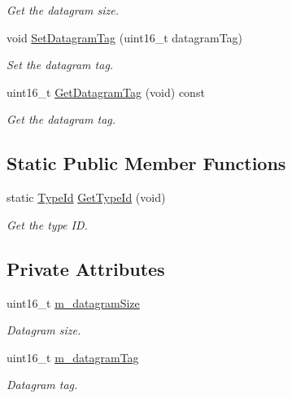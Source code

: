 \begin{DoxyCompactItemize}
\begin{DoxyCompactList}\small\item\em Get the datagram size. \end{DoxyCompactList}\item 
void \hyperlink{classns3_1_1SixLowPanFrag1_a52e5658907fdad50cd4fb0a6b708709c}{Set\+Datagram\+Tag} (uint16\+\_\+t datagram\+Tag)
\begin{DoxyCompactList}\small\item\em Set the datagram tag. \end{DoxyCompactList}\item 
uint16\+\_\+t \hyperlink{classns3_1_1SixLowPanFrag1_a9ff9beed8041cbce4454abf63d0c26d4}{Get\+Datagram\+Tag} (void) const 
\begin{DoxyCompactList}\small\item\em Get the datagram tag. \end{DoxyCompactList}\end{DoxyCompactItemize}
\subsection*{Static Public Member Functions}
\begin{DoxyCompactItemize}
\item 
static \hyperlink{classns3_1_1TypeId}{Type\+Id} \hyperlink{classns3_1_1SixLowPanFrag1_ab22c61041f7debb4239ffb6ed7fb4536}{Get\+Type\+Id} (void)
\begin{DoxyCompactList}\small\item\em Get the type ID. \end{DoxyCompactList}\end{DoxyCompactItemize}
\subsection*{Private Attributes}
\begin{DoxyCompactItemize}
\item 
uint16\+\_\+t \hyperlink{classns3_1_1SixLowPanFrag1_aead864146b5bc2382c2f17dfc0c64ec1}{m\+\_\+datagram\+Size}
\begin{DoxyCompactList}\small\item\em Datagram size. \end{DoxyCompactList}\item 
uint16\+\_\+t \hyperlink{classns3_1_1SixLowPanFrag1_ae0b93fdfa788a977987ea41447088529}{m\+\_\+datagram\+Tag}
\begin{DoxyCompactList}\small\item\em Datagram tag. \end{DoxyCompactList}\end{DoxyCompactItemize}
